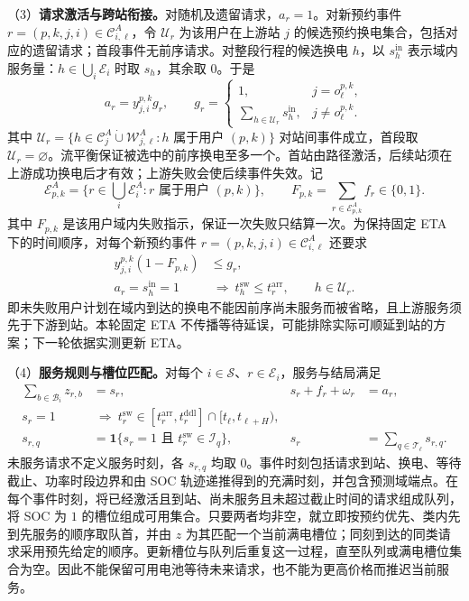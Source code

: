 \documentclass[12pt,a4paper,UTF8]{ctexart}
\begin{document}
（3）\textbf{请求激活与跨站衔接。}对随机及遗留请求，$a_r=1$。对新预约事件 $r=(p,k,j,i)\in\mathcal C_{i,\ell}^A$，令 $\mathcal U_r$ 为该用户在上游站 $j$ 的候选预约换电集合，包括对应的遗留请求；首段事件无前序请求。对整段行程的候选换电 $h$，以 $s_h^{\mathrm{in}}$ 表示域内服务量：$h\in\bigcup_i\mathcal E_i$ 时取 $s_h$，其余取 $0$。于是
\begin{equation}
a_r=y_{j,i}^{p,k}g_r,
\qquad
g_r=\begin{cases}
1,&j=o_\ell^{p,k},\\
\displaystyle\sum_{h\in\mathcal U_r}s_h^{\mathrm{in}},&j\ne o_\ell^{p,k}.
\end{cases}
\label{eq:reservation_alive_chain}
\end{equation}
其中 $\mathcal U_r=\{h\in\mathcal C_j^A\mathbin{\dot\cup}\mathcal W_{j,\ell}^A:h\text{ 属于用户 }(p,k)\}$ 对站间事件成立，首段取 $\mathcal U_r=\varnothing$。流平衡保证被选中的前序换电至多一个。首站由路径激活，后续站须在上游成功换电后才有效；上游失败会使后续事件失效。记
\[
\mathcal E_{p,k}^A=\{r\in\textstyle\bigcup_i\mathcal E_i^A:r\text{ 属于用户 }(p,k)\},
\qquad
F_{p,k}=\sum_{r\in\mathcal E_{p,k}^A}f_r\in\{0,1\}.
\]
其中 $F_{p,k}$ 是该用户域内失败指示，保证一次失败只结算一次。为保持固定 ETA 下的时间顺序，对每个新预约事件 $r=(p,k,j,i)\in\mathcal C_{i,\ell}^A$ 还要求
\begin{equation}
\begin{aligned}
y_{j,i}^{p,k}(1-F_{p,k})&\le g_r,\\
a_r=s_h^{\mathrm{in}}=1&\ \Longrightarrow\
t_h^{\mathrm{sw}}\le t_r^{\mathrm{arr}},\qquad h\in\mathcal U_r.
\end{aligned}
\label{eq:arrival_causality}
\end{equation}
即未失败用户计划在域内到达的换电不能因前序尚未服务而被省略，且上游服务须先于下游到站。本轮固定 ETA 不传播等待延误，可能排除实际可顺延到站的方案；下一轮依据实测更新 ETA。

（4）\textbf{服务规则与槽位匹配。}对每个 $i\in\mathcal S$、$r\in\mathcal E_i$，服务与结局满足
\begin{equation}
\begin{aligned}
\sum_{b\in\mathcal B_i}z_{r,b}&=s_r,
&s_r+f_r+\omega_r&=a_r,\\
s_r=1&\ \Longrightarrow\
t_r^{\mathrm{sw}}\in[t_r^{\mathrm{arr}},t_r^{\mathrm{ddl}}]
\cap[t_\ell,t_{\ell+H}),\\
s_{r,q}&=\mathbf1\{s_r=1\text{ 且 }t_r^{\mathrm{sw}}\in\mathcal I_q\},
&s_r&=\sum_{q\in\mathcal T_\ell}s_{r,q}.
\end{aligned}
\label{eq:service_window}
\end{equation}
未服务请求不定义服务时刻，各 $s_{r,q}$ 均取 $0$。事件时刻包括请求到站、换电、等待截止、功率时段边界和由 SOC 轨迹递推得到的充满时刻，并包含预测域端点。在每个事件时刻，将已经激活且到站、尚未服务且未超过截止时间的请求组成队列，将 SOC 为 $1$ 的槽位组成可用集合。只要两者均非空，就立即按预约优先、类内先到先服务的顺序取队首，并由 $z$ 为其匹配一个当前满电槽位；同刻到达的同类请求采用预先给定的顺序。更新槽位与队列后重复这一过程，直至队列或满电槽位集合为空。因此不能保留可用电池等待未来请求，也不能为更高价格而推迟当前服务。
\end{document}
